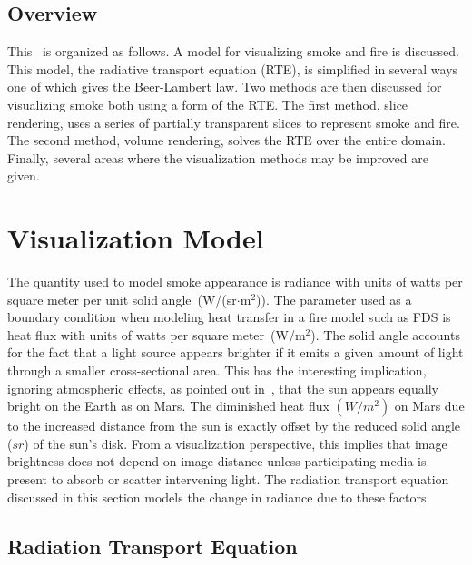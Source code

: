 \subsection{Overview}
This \paper\ is organized as follows.  A model for visualizing smoke and fire is discussed.  This model, the radiative transport equation (RTE), is simplified in several ways one of which gives the Beer-Lambert law.  Two methods are then discussed for visualizing smoke  both using a form of the RTE.  The first method, slice rendering,  uses a series of partially transparent slices to represent smoke and fire. The second method, volume rendering, solves the RTE over the entire domain. Finally, several areas where the visualization methods may be improved are given.

%
%

\section{Visualization Model}
The quantity used to model smoke appearance is radiance with units of watts per square meter per unit solid angle~(W/(sr$\cdot$m$^2$)).  The parameter used as a boundary condition when modeling heat transfer in a fire model such as FDS is heat flux with units of watts per square meter~(W/m$^2$). The solid angle accounts for the fact that a light source appears brighter if it emits a given amount of light through a smaller cross-sectional area.  This has the interesting implication, ignoring atmospheric effects, as pointed out in~\cite{dutre:2002}, that the sun appears equally bright on the Earth as on Mars.  The diminished heat flux $(W/m^2)$ on Mars due to the increased distance from the sun is exactly offset by the reduced solid angle ($sr$) of the sun's disk.  From a visualization perspective, this implies that image brightness does not depend on image distance unless  participating media is present to absorb or scatter  intervening light.  The radiation transport equation discussed in this section models the change in radiance due to these factors.

%
%

\subsection{Radiation Transport Equation}
\newcommand{\siga}{ \sigma_a(x) }
\newcommand{\sigt}{ \sigma_t(x) }
\newcommand{\sigs}{ \sigma_s(x) }
\newcommand{\sigts}{ \sigma_t(s) }
\newcommand{\Le}{ C_e(x) }
\newcommand{\Lexo}{ C_e(x,\omega) }
\newcommand{\Lxo}{ C(x,\omega) }
\newcommand{\dLdx}{ \frac{dC}{dx}(x)}
\newcommand{\intf}[2]{ \exp\left({\int_{#1}^{#2} \sigts ds}\right) }
\newcommand{\intff}[2]{ {\int_{#1}^{#2} \sigts ds} }
\newcommand{\intmf}[2]{ \exp\left({-\int_{#1}^{#2} \sigts ds}\right) }
\newcommand{\intmff}[2]{ {-\int_#1^#2 \sigts ds} }

